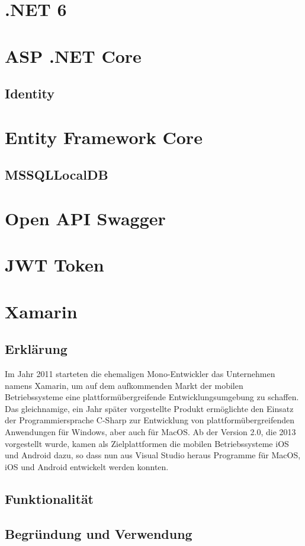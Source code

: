 \section{.NET 6}
\lipsum[5-12]

\section{ASP .NET Core}
\lipsum[12-17]

\subsection{Identity}
\lipsum[1-2]

\section{Entity Framework Core}
\lipsum[17-20]

\subsection{MSSQLLocalDB}
\lipsum[30-40]

\section{Open API Swagger}
\lipsum[20-22]

\section{JWT Token}
\lipsum[22-25]

\section{Xamarin}
\subsection*{Erklärung}
Im Jahr 2011 starteten die ehemaligen Mono-Entwickler 
das Unternehmen namens Xamarin, um auf dem aufkommenden 
Markt der mobilen Betriebssysteme eine plattformübergreifende
Entwicklungsumgebung zu schaffen. Das gleichnamige,
ein Jahr später vorgestellte Produkt ermöglichte
den Einsatz der Programmiersprache C-Sharp zur Entwicklung
von plattformübergreifenden Anwendungen für Windows, 
aber auch für MacOS. Ab der Version 2.0, die 2013 vorgestellt wurde, 
kamen als Zielplattformen die mobilen Betriebssysteme iOS und 
Android dazu, so dass nun aus Visual Studio heraus Programme für 
MacOS, iOS und Android entwickelt werden konnten.
\subsection*{Funktionalität}
\subsection*{Begründung und Verwendung}